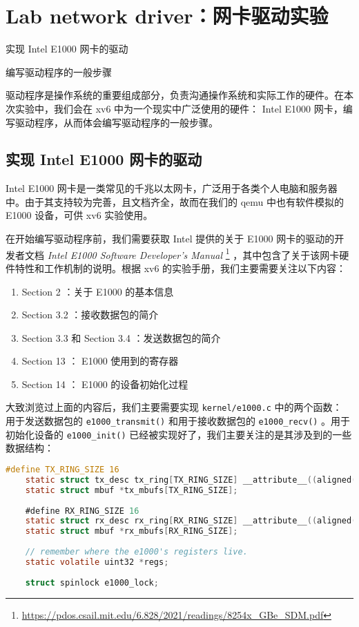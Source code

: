 \chapter{Lab network driver：网卡驱动实验}
\begin{introduction}
    \item 实现 Intel E1000 网卡的驱动
    \item 编写驱动程序的一般步骤
\end{introduction}

驱动程序是操作系统的重要组成部分，负责沟通操作系统和实际工作的硬件。在本次实验中，我们会在 xv6 中为一个现实中广泛使用的硬件： Intel E1000 网卡，编写驱动程序，从而体会编写驱动程序的一般步骤。

\section{实现 Intel E1000 网卡的驱动}

Intel E1000 网卡是一类常见的千兆以太网卡，广泛用于各类个人电脑和服务器中。由于其支持较为完善，且文档齐全，故而在我们的 qemu 中也有软件模拟的 E1000 设备，可供 xv6 实验使用。

在开始编写驱动程序前，我们需要获取 Intel 提供的关于 E1000 网卡的驱动的开发者文档 \textit{Intel E1000 Software Developer's Manual} \footnote{\url{https://pdos.csail.mit.edu/6.828/2021/readings/8254x_GBe_SDM.pdf}} ，其中包含了关于该网卡硬件特性和工作机制的说明。根据 xv6 的实验手册，我们主要需要关注以下内容：
\begin{enumerate}
    \item Section 2 ：关于 E1000 的基本信息
    \item Section 3.2 ：接收数据包的简介
    \item Section 3.3 和 Section 3.4 ：发送数据包的简介
    \item Section 13 ： E1000 使用到的寄存器
    \item Section 14 ： E1000 的设备初始化过程
\end{enumerate}

大致浏览过上面的内容后，我们主要需要实现 \lstinline{kernel/e1000.c} 中的两个函数： 用于发送数据包的 \lstinline{e1000_transmit()} 和用于接收数据包的 \lstinline{e1000_recv()} 。用于初始化设备的 \lstinline{e1000_init()} 已经被实现好了，我们主要关注的是其涉及到的一些数据结构：
\begin{lstlisting}[language=C]
    #define TX_RING_SIZE 16
    static struct tx_desc tx_ring[TX_RING_SIZE] __attribute__((aligned(16)));
    static struct mbuf *tx_mbufs[TX_RING_SIZE];
    
    #define RX_RING_SIZE 16
    static struct rx_desc rx_ring[RX_RING_SIZE] __attribute__((aligned(16)));
    static struct mbuf *rx_mbufs[RX_RING_SIZE];
    
    // remember where the e1000's registers live.
    static volatile uint32 *regs;
    
    struct spinlock e1000_lock;
\end{lstlisting}

